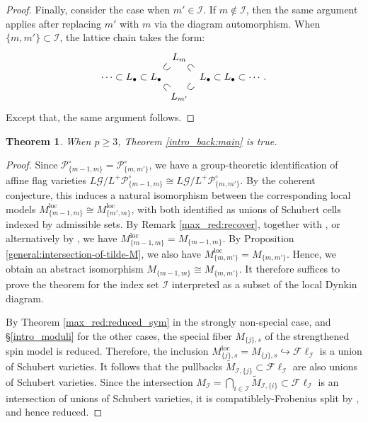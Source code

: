 \documentclass[pdflatex,sn-mathphys-num]{sn-jnl}%
\theoremstyle{thmstyleone}%
\newtheorem{theorem}[subsubsection]{Theorem}%
\theoremstyle{thmstyletwo}%
\numberwithin{equation}{subsection}
\theoremstyle{thmstylethree}%
\newcommand{\CG}{\ensuremath{\mathcal{G}}\xspace}
\newcommand{\CI}{\ensuremath{\mathcal{I}}\xspace}
\newcommand{\CP}{\ensuremath{\mathcal{P}}\xspace}
\newcommand{\loc}{\ensuremath{\mathrm{loc}}\xspace}
\newcommand{\wt}{\widetilde}
\newcommand{\Fl}{\mathcal{F}\ell}
\begin{document}
\begin{proof}
Finally, consider the case when $m'\in \CI$. If $m\not\in \CI$, then the same argument applies after replacing $m'$ with $m$ via the diagram automorphism. 
When $\{m,m'\}\subset\CI$, the lattice chain takes the form:
\begin{equation*}
\xy
(-17,7)*+{\cdots\subset L_\bullet\subset L_\bullet};
(-4.5,3.5)*+{\rotatebox{-45}{$\,\, \subset\,\,$}};
(-4.5,10.5)*+{\rotatebox{45}{$\,\, \subset\,\,$}};
(0,14)*+{L_m};
(0,0)*+{L_{m'}};
(4,3.5)*+{\rotatebox{45}{$\,\, \subset\,\,$}};
(4,10.5)*+{\rotatebox{-45}{$\,\, \subset\,\,$}};
(19,7)*+{L_\bullet \subset  L_\bullet\subset\cdots.}
\endxy
\end{equation*}
Except that, the same argument follows.

\end{proof}

\begin{theorem}\label{general:p-geq-3}
    When $p\geq 3$, Theorem \ref{intro_back:main} is true.
\end{theorem}
\begin{proof}
Since $\CP_{\{m-1,m\}}^{\circ}=\CP^{\circ}_{\{m,m'\}}$, we have a group-theoretic identification of affine flag varieties $L\CG/L^+\CP_{\{m-1,m\}}^{\circ}\cong L\CG/L^+\CP_{\{m,m'\}}^{\circ}$. By the coherent conjecture, this induces a natural isomorphism between the corresponding local models $M^{\loc}_{\{m-1,m\}}\cong M^{\loc}_{\{m',m\}}$, with both identified as unions of Schubert cells indexed by admissible sets. 
By Remark \ref{max_red:recover}, together with \cite[Proposition 9.12]{RSZ2018}, or alternatively by \cite{Yu2019}, we have $M^{\loc}_{\{m-1,m\}}=M_{\{m-1,m\}}$. 
By Proposition \ref{general:intersection-of-tilde-M}, we also have $M^{\loc}_{\{m,m'\}}=M_{\{m,m'\}}$. Hence, we obtain an abstract isomorphism $M_{\{m-1,m\}}\cong M_{\{m,m'\}}$.
It therefore suffices to prove the theorem for the index set $\CI$ interpreted as a subset of the local Dynkin diagram.

By Theorem \ref{max_red:reduced_sym} in the strongly non-special case, and \S \ref{intro_moduli} for the other cases, the special fiber $M_{\{j\},s}$ of the strengthened spin model is reduced.
Therefore, the inclusion $M_{\{j\},s}^\loc=M_{\{j\},s}\hookrightarrow\Fl_\CI$ is a union of Schubert varieties.
It follows that the pullbacks $\wt{M}_{\CI,\{j\}}\subset \Fl_\CI$ are also unions of Schubert varieties.
Since the intersection 
$M_\CI=\bigcap_{i\in \CI}\wt{M}_{\CI,\{i\}}\subset \Fl_\CI$ is an intersection of unions of Schubert varieties, it is compatiblely-Frobenius split by \cite[Corollary 2.7]{Gortz2001}, and hence reduced.
\end{proof}
\end{document}
